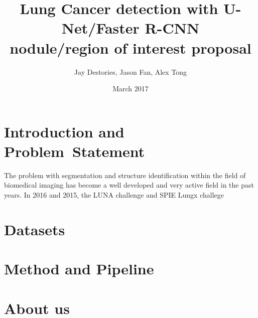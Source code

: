 \documentclass[twocolumn,10pt]{article}
\title{Lung Cancer detection with U-Net/Faster R-CNN \\
nodule/region of interest proposal}
\author{Jay Destories, Jason Fan, Alex Tong}
\date{March 2017}
\begin{document}
\maketitle
\section{Introduction and \\Problem~Statement}
The problem with segmentation and structure identification within the field of 
biomedical imaging has become a well developed and very active field in the past
years. In 2016 and 2015, the LUNA challenge and SPIE Lungx challege
\section{Datasets}
\section{Method and Pipeline}
\section{About us}
\end{document}
